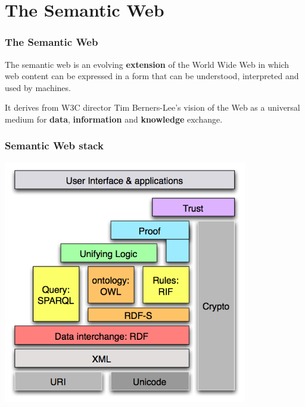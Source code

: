 \documentclass[spanish,notes=hide,16pt]{beamer}
\begin{document}
\section{The Semantic Web}
\frame
{
  \frametitle{The Semantic Web}

  \begin{Large}
    The semantic web is an evolving \textbf{extension} of the World Wide Web in 
    which web content can be expressed in a form that can be understood, 
    interpreted and used by machines.
  \end{Large}
  
  \vspace{1cm}

  \begin{Large}
    It derives from W3C director Tim Berners-Lee's vision of the Web as a universal 
    medium for \textbf{data}, \textbf{information} and \textbf{knowledge} exchange.
  \end{Large}
}
\frame
{
  \frametitle{Semantic Web stack}

  \begin{center}
    \includegraphics[width=0.8\textwidth]{images/semantic-web-stack.png}
  \end{center}

}
\frame
\end{document}
